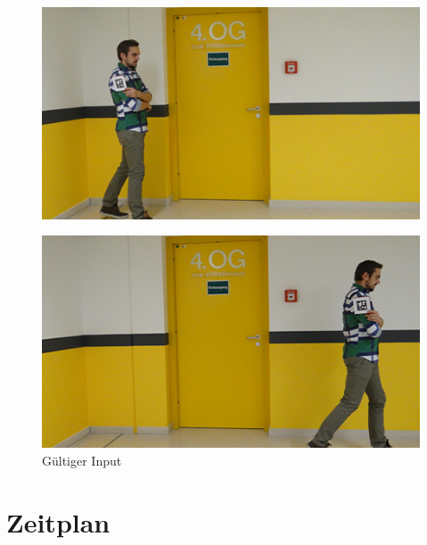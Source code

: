 \documentclass[deutsch]{scrartcl}
\begin{document}
\begin{figure}[ht]
	\centering
	\includegraphics{testimg1.png}
	\label{fig3}
\end{figure}
\begin{figure}[ht]
	\centering
	\includegraphics{testimg2.png}
	\caption{Gültiger Input}
	\label{fig4}
\end{figure}


\section{Zeitplan}
\end{document}
